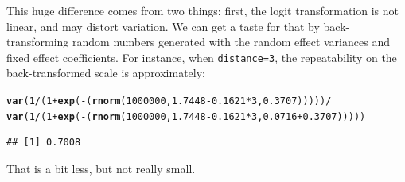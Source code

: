 \documentclass[12pt,a4paper]{scrartcl}\usepackage[]{graphicx}\usepackage[]{color}
\makeatletter
\newcommand{\hlnum}[1]{\textcolor[rgb]{0.686,0.059,0.569}{#1}}%
\newcommand{\hlopt}[1]{\textcolor[rgb]{0,0,0}{#1}}%
\newcommand{\hlstd}[1]{\textcolor[rgb]{0.345,0.345,0.345}{#1}}%
\newcommand{\hlkwd}[1]{\textcolor[rgb]{0.737,0.353,0.396}{\textbf{#1}}}%
\newenvironment{kframe}{%
 \def\at@end@of@kframe{}%
 \ifinner\ifhmode%
  \def\at@end@of@kframe{\end{minipage}}%
  \begin{minipage}{\columnwidth}%
 \fi\fi%
 \def\FrameCommand##1{\hskip\@totalleftmargin \hskip-\fboxsep
 \colorbox{shadecolor}{##1}\hskip-\fboxsep
     \hskip-\linewidth \hskip-\@totalleftmargin \hskip\columnwidth}%
 \MakeFramed {\advance\hsize-\width
   \@totalleftmargin\z@ \linewidth\hsize
   \@setminipage}}%
 {\par\unskip\endMakeFramed%
 \at@end@of@kframe}
\newenvironment{knitrout}{}{} %
\makeatother
\begin{document}
\begin{Answer}
This huge difference comes from two things: first, the logit transformation is not linear, and may distort variation. We can get a taste for that by back-transforming random numbers generated with the random effect variances and fixed effect coefficients. For instance, when \texttt{distance=3}, the repeatability on the back-transformed scale is approximately:

\begin{knitrout}
\color{fgcolor}\begin{kframe}
\begin{alltt}
\hlkwd{var}\hlstd{(}\hlnum{1}\hlopt{/}\hlstd{(}\hlnum{1}\hlopt{+}\hlkwd{exp}\hlstd{(}\hlopt{-}\hlstd{(}\hlkwd{rnorm}\hlstd{(}\hlnum{1000000}\hlstd{,} \hlnum{1.7448}\hlopt{-}\hlnum{0.1621}\hlopt{*}\hlnum{3}\hlstd{,} \hlnum{0.3707}\hlstd{)))))} \hlopt{/}
  \hlkwd{var}\hlstd{(}\hlnum{1}\hlopt{/}\hlstd{(}\hlnum{1}\hlopt{+}\hlkwd{exp}\hlstd{(}\hlopt{-}\hlstd{(}\hlkwd{rnorm}\hlstd{(}\hlnum{1000000}\hlstd{,} \hlnum{1.7448}\hlopt{-}\hlnum{0.1621}\hlopt{*}\hlnum{3}\hlstd{,} \hlnum{0.0716}\hlopt{+}\hlnum{0.3707}\hlstd{)))))}
\end{alltt}
\begin{verbatim}
## [1] 0.7008
\end{verbatim}
\end{kframe}
\end{knitrout}
That is a bit less, but not really small.


\end{Answer}
\end{document}

